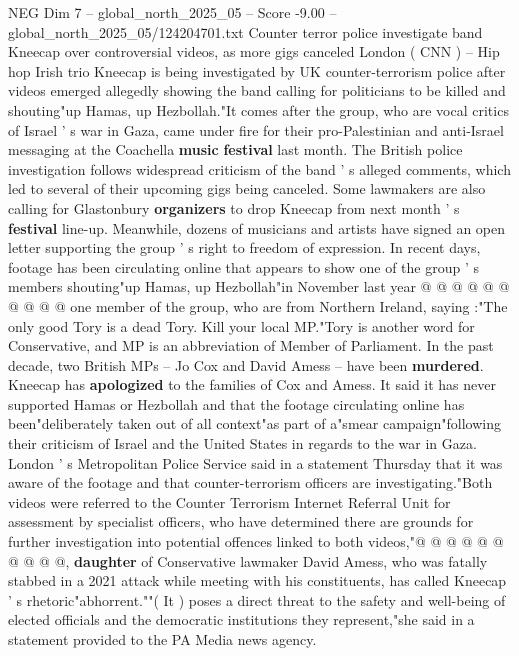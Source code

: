 \begin{textsample}{NEG Dim 7 – global\_north\_2025\_05 – Score -9.00 – global\_north\_2025\_05/124204701.txt}  \label{ex:f7_neg_104}
Counter terror police investigate band Kneecap over controversial videos, as more gigs canceled London ( CNN ) -- Hip hop Irish trio Kneecap is being investigated by UK counter-terrorism police after videos emerged allegedly showing the band calling for politicians to be killed and shouting"up Hamas, up Hezbollah."It comes after the group, who are vocal critics of Israel ' s war in Gaza, came under fire for their pro-Palestinian and anti-Israel messaging at the Coachella \textbf{music} \textbf{festival} last month.
The British police investigation follows widespread criticism of the band ' s alleged comments, which led to several of their upcoming gigs being canceled.
Some lawmakers are also calling for Glastonbury \textbf{organizers} to drop Kneecap from next month ' s \textbf{festival} line-up.
Meanwhile, dozens of musicians and artists have signed an open letter supporting the group ' s right to freedom of expression.
In recent days, footage has been circulating online that appears to show one of the group ' s members shouting"up Hamas, up Hezbollah"in November last year @ @ @ @ @ @ @ @ @ @ one member of the group, who are from Northern Ireland, saying :"The only good Tory is a dead Tory.
Kill your local MP."Tory is another word for Conservative, and MP is an abbreviation of Member of Parliament.
In the past decade, two British MPs -- Jo Cox and David Amess -- have been \textbf{murdered}.
Kneecap has \textbf{apologized} to the families of Cox and Amess.
It said it has never supported Hamas or Hezbollah and that the footage circulating online has been"deliberately taken out of all context"as part of a"smear campaign"following their criticism of Israel and the United States in regards to the war in Gaza.
London ' s Metropolitan Police Service said in a statement Thursday that it was aware of the footage and that counter-terrorism officers are investigating."Both videos were referred to the Counter Terrorism Internet Referral Unit for assessment by specialist officers, who have determined there are grounds for further investigation into potential offences linked to both videos,"@ @ @ @ @ @ @ @ @ @, \textbf{daughter} of Conservative lawmaker David Amess, who was fatally stabbed in a 2021 attack while meeting with his constituents, has called Kneecap ' s rhetoric"abhorrent.""( It ) poses a direct threat to the safety and well-being of elected officials and the democratic institutions they represent,"she said in a statement provided to the PA Media news agency.

\end{textsample}

